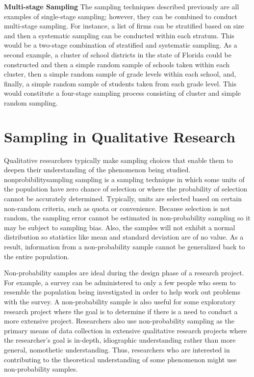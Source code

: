 \textbf{Multi-stage Sampling} The sampling techniques described previously are all examples of single-stage sampling; however, they can be combined to conduct multi-stage sampling. For instance, a list of firms can be stratified based on size and then a systematic sampling can be conducted within each stratum. This would be a two-stage combination of stratified and systematic sampling. As a second example, a cluster of school districts in the state of Florida could be constructed and then a simple random sample of schools taken within each cluster, then a simple random sample of grade levels within each school, and, finally, a simple random sample of students taken from each grade level. This would constitute a four-stage sampling process consisting of cluster and simple random sampling.

\section{Sampling in Qualitative Research}

Qualitative researchers typically make sampling choices that enable them to deepen their understanding of the phenomenon being studied. \Gls{nonprobibilitysampling} sampling is a sampling technique in which some units of the population have zero chance of selection or where the probability of selection cannot be accurately determined. Typically, units are selected based on certain non-random criteria, such as quota or convenience. Because selection is not random, the sampling error cannot be estimated in non-probability sampling so it may be subject to sampling bias. Also, the samples will not exhibit a normal distribution so statistics like mean and standard deviation are of no value. As a result, information from a non-probability sample cannot be generalized back to the entire population. 

Non-probability samples are ideal during the design phase of a research project. For example, a survey can be administered to only a few people who seem to resemble the population being investigated in order to help work out problems with the survey. A non-probability sample is also useful for some exploratory research project where the goal is to determine if there is a need to conduct a more extensive project. Researchers also use non-probability sampling as the primary means of data collection in extensive qualitative research projects where the researcher's goal is in-depth, \gls{idiographic} understanding rather than more general, \gls{nomothetic} understanding. Thus, researchers who are interested in contributing to the theoretical understanding of some phenomenon might use non-probability samples. 

